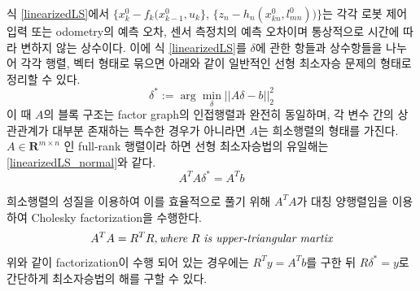 \documentclass[master,korean,final]{cbnu-ecs}
\begin{document}
식 \eqref{linearizedLS}에서 $\{x_k^0 - f_k(x^0_{k-1}, u_k\}$, $\{z_n - h_n(x^0_{kn}, l^0_{mn})) \}$는 각각 로봇 제어 입력 또는 odometry의 예측 오차, 센서 측정치의 예측 오차이며 통상적으로 시간에 따라 변하지 않는 상수이다. 이에 식 \eqref{linearizedLS}를 $\delta$에 관한 항들과 상수항들을 나누어 각각 행렬, 벡터 형태로 묶으면 아래와 같이 일반적인 선형 최소자승 문제의 형태로 정리할 수 있다.
\begin{equation}
\label{linearizedLS_simple}
\delta^*:=\arg\min_\delta || A\delta - b ||^2_2
\end{equation}
이 때 $A$의 블록 구조는 factor graph의 인접행렬과 완전히 동일하며, 각 변수 간의 상관관계가 대부분 존재하는 특수한 경우가 아니라면 $A$는 희소행렬의 형태를 가진다.
$A \in \mathbf{R}^{m\times n}$ 인 full-rank 행렬이라 하면 선형 최소자승법의 유일해는 \eqref{linearizedLS_normal}와 같다.
\begin{equation}
\label{linearizedLS_normal}
A^T A\delta^*= A^T b
\end{equation}
 
희소행렬의 성질을 이용하여 이를 효율적으로 풀기 위해 $A^T A$가 대칭 양행렬임을 이용하여 Cholesky factorization을 수행한다.
\begin{equation}
\label{cholesky}
A^T A = R^T R, \emph{where}\ R\ \emph{is upper-triangular martix}
\end{equation}
위와 같이 factorization이 수행 되어 있는 경우에는 $R^T y=A^T b$를 구한 뒤 $R\delta^*=y$로 간단하게 최소자승법의 해를 구할 수 있다. 

\newpage
\end{document}

